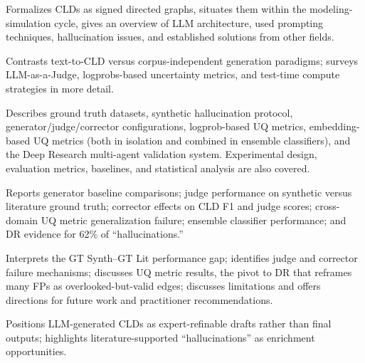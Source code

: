 \begin{description}[leftmargin=1.5em, labelindent=0em, itemsep=1pt, parsep=1pt]
    \item[Chapter 2 -- Background:] Formalizes CLDs as signed directed graphs, situates them within the modeling-simulation cycle, gives an overview of LLM architecture, used prompting techniques, hallucination issues, and established solutions from other fields.
    \item[Chapter 3 -- Related Work:] Contrasts text-to-CLD versus corpus-independent generation paradigms; surveys LLM-as-a-Judge, logprobs-based uncertainty metrics, and test-time compute strategies in more detail.
    \item[Chapter 4 -- Methods:] Describes ground truth datasets, synthetic hallucination protocol, generator/judge/corrector configurations, logprob-based UQ metrics, embedding-based UQ metrics (both in isolation and combined in ensemble classifiers), and the Deep Research multi-agent validation system. Experimental design, evaluation metrics, baselines, and statistical analysis are also covered.
    \item[Chapter 5 -- Results:] Reports generator baseline comparisons; judge performance on synthetic versus literature ground truth; corrector effects on CLD F1 and judge scores; cross-domain UQ metric generalization failure; ensemble classifier performance; and DR evidence for 62\% of ``hallucinations.''
    \item[Chapter 6 -- Discussion:] Interprets the GT Synth--GT Lit performance gap; identifies judge and corrector failure mechanisms; discusses UQ metric results, the pivot to DR that reframes many FPs as overlooked-but-valid edges; discusses limitations and offers directions for future work and practitioner recommendations.
    \item[Chapter 7 -- Conclusion:] Positions LLM-generated CLDs as expert-refinable drafts rather than final outputs; highlights literature-supported ``hallucinations'' as enrichment opportunities.
\end{description}







